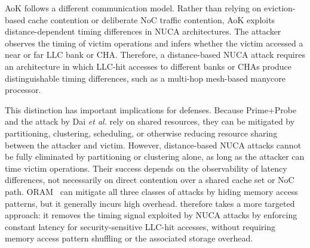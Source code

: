 AoK follows a different communication model.
Rather than relying on eviction-based cache contention or deliberate NoC traffic contention, AoK exploits distance-dependent timing differences in NUCA architectures.
The attacker observes the timing of victim operations and infers whether the victim accessed a near or far LLC bank or CHA.
Therefore, a distance-based NUCA attack requires an architecture in which LLC-hit accesses to different banks or CHAs produce distinguishable timing differences, such as a multi-hop mesh-based manycore processor.

This distinction has important implications for defenses.
Because Prime+Probe and the attack by Dai \textit{et al.} rely on shared resources, they can be mitigated by partitioning, clustering, scheduling, or otherwise reducing resource sharing between the attacker and victim.
However, distance-based NUCA attacks cannot be fully eliminated by partitioning or clustering alone, as long as the attacker can time victim operations.
Their success depends on the observability of latency differences, not necessarily on direct contention over a shared cache set or NoC path.
ORAM~\cite{oram} can mitigate all three classes of attacks by hiding memory access patterns, but it generally incurs high overhead.
\scheme{} therefore takes a more targeted approach: it removes the timing signal exploited by NUCA attacks by enforcing constant latency for security-sensitive LLC-hit accesses, without requiring memory access pattern shuffling or the associated storage overhead.
